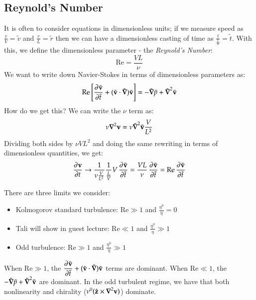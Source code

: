 \subsection{Reynold's Number}
It is often to consider equations in dimensionless units; if we measure speed as $\frac{v}{V} = \tilde{v}$ and $\frac{r}{L} = \tilde{r}$ then we can have a dimensionless casting of time as $\frac{t}{\frac{L}{V}} = \tilde{t}$. With this, we define the dimensionless parameter - the \emph{Reynold's Number}:
\begin{equation}
    \text{Re} = \frac{VL}{\nu}
\end{equation}
We want to write down Navier-Stokes in terms of dimensionless parameters as:
\begin{equation}
    \text{Re}\left[\dpd{\tilde{\v{v}}}{\tilde{t}} + (\tilde{\v{v}}\cdot\tilde{\nabla})\tilde{\v{v}}\right] = -\tilde{\nabla}\tilde{p} + \tilde{\nabla}^2\tilde{\v{v}}
\end{equation}
How do we get this? We can write the $\nu$ term as:
\begin{equation}
    \nu\nabla^2 \v{v} = \nu \tilde{\nabla}^2\tilde{\v{v}}\frac{V}{L^2}
\end{equation}
Dividing both sides by $\nu VL^2$ and doing the same rewriting in terms of dimensionless quantities, we get:
\begin{equation}
    \dpd{\v{v}}{t} \to \frac{1}{\nu \frac{V}{L^2}}\frac{1}{\frac{L}{V}}V \dpd{\tilde{\v{v}}}{\tilde{t}} = \frac{VL}{\nu}\dpd{\tilde{\v{v}}}{\tilde{t}} = \text{Re}\dpd{\tilde{\v{v}}}{\tilde{t}}
\end{equation}

There are three limits we consider:
\begin{itemize}
    \item Kolmogorov standard turbulence: $\text{Re} \gg 1$ and $\frac{\eta^0}{\eta} = 0$
    \item Tali will show in guest lecture: $\text{Re} \ll 1$ and $\frac{\eta^0}{\eta} \gg 1$
    \item Odd turbulence: $\text{Re} \gg 1$ and $\frac{\eta^0}{\eta} \gg 1$
\end{itemize}

When $\text{Re} \gg 1$, the $\dpd{\tilde{\v{v}}}{\tilde{t}} + (\tilde{\v{v}}\cdot\tilde{\nabla})\tilde{\v{v}}$ terms are dominant. When $\text{Re} \ll 1$, the $-\tilde{\nabla}\tilde{p} + \tilde{\nabla}^2\tilde{\v{v}}$ are dominant. In the odd turbulent regime, we have that both nonlinearity and chirality ($\nu^0 (\hat{\v{z}} \times \nabla^2 \v{v})$) dominate.



